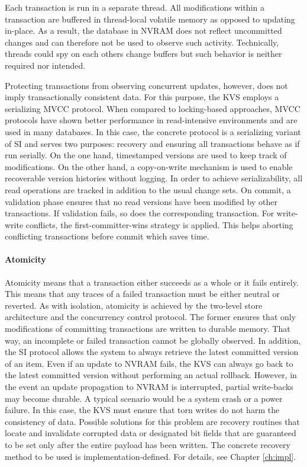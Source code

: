 Each transaction is run in a separate thread. All modifications within a
transaction are buffered in thread-local volatile memory as opposed to updating
in-place. As a result, the database in \ac{NVRAM} does not reflect uncommitted
changes and can therefore not be used to observe such activity. Technically,
threads could spy on each others change buffers but such behavior is neither
required nor intended.

Protecting transactions from observing concurrent updates, however, does not
imply transactionally consistent data. For this purpose, the \ac{KVS} employs a
serializing \ac{MVCC} protocol. When compared to locking-based approaches,
\ac{MVCC} protocols have shown better performance in read-intensive environments
and are used in many databases. In this case, the concrete protocol is a
serializing variant of \ac{SI} and serves two purposes: recovery and ensuring
all transactions behave as if run serially. On the one hand, timestamped
versions are used to keep track of modifications. On the other hand, a
copy-on-write mechanism is used to enable recoverable version histories without
logging. In order to achieve serializability, all read operations are tracked in addition to the usual change sets. On commit, a validation phase ensures that no read versions have been modified by other transactions. If validation fails, so does the corresponding transaction. For write-write conflicts, the first-committer-wins strategy is applied. This helps aborting conflicting transactions before commit which saves time.

\paragraph{Atomicity}

Atomicity means that a transaction either succeeds as a whole or it fails
entirely. This means that any traces of a failed transaction must be either
neutral or reverted. As with isolation, atomicity is achieved by the two-level
store architecture and the concurrency control protocol. The former ensures that
only modifications of committing transactions are written to durable memory.
That way, an incomplete or failed transaction cannot be globally observed. In
addition, the \ac{SI} protocol allows the system to always retrieve the latest
committed version of an item. Even if an update to \ac{NVRAM} fails, the
\ac{KVS} can always go back to the latest committed version without performing
an actual rollback. However, in the event an update propagation to \ac{NVRAM} is
interrupted, partial write-backs may become durable. A typical scenario would be
a system crash or a power failure. In this case, the \ac{KVS} must ensure that
torn writes do not harm the consistency of data. Possible solutions for this
problem are recovery routines that locate and invalidate corrupted data or
designated bit fields that are guaranteed to be set only after the entire payload
has been written. The concrete recovery method to be used is
implementation-defined. For details, see Chapter \ref{ch:impl}.

